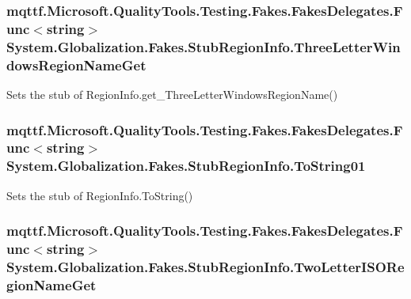 \hypertarget{class_system_1_1_globalization_1_1_fakes_1_1_stub_region_info_a2e69f10658377a338ed7e59cc18c9e0c}{
\subsubsection[{Three\-Letter\-Windows\-Region\-Name\-Get}]{\setlength{\rightskip}{0pt plus 5cm}mqttf.\-Microsoft.\-Quality\-Tools.\-Testing.\-Fakes.\-Fakes\-Delegates.\-Func$<$string$>$ System.\-Globalization.\-Fakes.\-Stub\-Region\-Info.\-Three\-Letter\-Windows\-Region\-Name\-Get}}\label{class_system_1_1_globalization_1_1_fakes_1_1_stub_region_info_a2e69f10658377a338ed7e59cc18c9e0c}


Sets the stub of Region\-Info.\-get\-\_\-\-Three\-Letter\-Windows\-Region\-Name()

\hypertarget{class_system_1_1_globalization_1_1_fakes_1_1_stub_region_info_a9c81422884a8b642461e497e10ee8be3}{
\subsubsection[{To\-String01}]{\setlength{\rightskip}{0pt plus 5cm}mqttf.\-Microsoft.\-Quality\-Tools.\-Testing.\-Fakes.\-Fakes\-Delegates.\-Func$<$string$>$ System.\-Globalization.\-Fakes.\-Stub\-Region\-Info.\-To\-String01}}\label{class_system_1_1_globalization_1_1_fakes_1_1_stub_region_info_a9c81422884a8b642461e497e10ee8be3}


Sets the stub of Region\-Info.\-To\-String()

\hypertarget{class_system_1_1_globalization_1_1_fakes_1_1_stub_region_info_aa726204bb371b2cc1cfc1d63eae8c9b2}{
\subsubsection[{Two\-Letter\-I\-S\-O\-Region\-Name\-Get}]{\setlength{\rightskip}{0pt plus 5cm}mqttf.\-Microsoft.\-Quality\-Tools.\-Testing.\-Fakes.\-Fakes\-Delegates.\-Func$<$string$>$ System.\-Globalization.\-Fakes.\-Stub\-Region\-Info.\-Two\-Letter\-I\-S\-O\-Region\-Name\-Get}}\label{class_system_1_1_globalization_1_1_fakes_1_1_stub_region_info_aa726204bb371b2cc1cfc1d63eae8c9b2}


